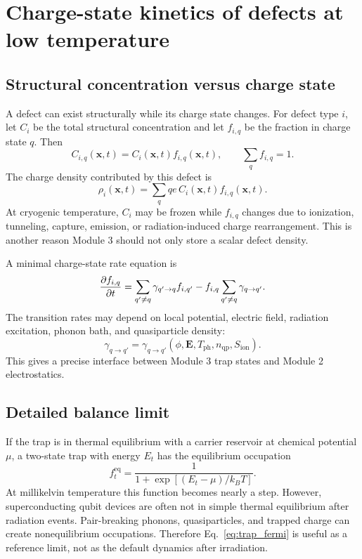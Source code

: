 \documentclass[11pt]{article}
\newcommand{\x}{\mathbf{x}}
\begin{document}
\section{Charge-state kinetics of defects at low temperature}

\subsection{Structural concentration versus charge state}

A defect can exist structurally while its charge state changes. For defect type $i$, let $C_i$ be the total structural concentration and let $f_{i,q}$ be the fraction in charge state $q$. Then
\begin{equation}
C_{i,q}(\x,t)=C_i(\x,t)f_{i,q}(\x,t),
\qquad
\sum_q f_{i,q}=1.
\label{eq:charge_state_fraction}
\end{equation}
The charge density contributed by this defect is
\begin{equation}
\rho_i(\x,t)=\sum_q q e\,C_i(\x,t)f_{i,q}(\x,t).
\label{eq:defect_charge_states}
\end{equation}
At cryogenic temperature, $C_i$ may be frozen while $f_{i,q}$ changes due to ionization, tunneling, capture, emission, or radiation-induced charge rearrangement. This is another reason Module 3 should not only store a scalar defect density.

A minimal charge-state rate equation is
\begin{equation}
\pdv{f_{i,q}}{t}
=\sum_{q'\neq q}\gamma_{q'\rightarrow q}f_{i,q'}
-f_{i,q}\sum_{q'\neq q}\gamma_{q\rightarrow q'}.
\label{eq:charge_state_master}
\end{equation}
The transition rates may depend on local potential, electric field, radiation excitation, phonon bath, and quasiparticle density:
\begin{equation}
\gamma_{q\rightarrow q'}=
\gamma_{q\rightarrow q'}(\phi,\mathbf{E},T_{\mathrm{ph}},n_{\mathrm{qp}},S_{\mathrm{ion}}).
\end{equation}
This gives a precise interface between Module 3 trap states and Module 2 electrostatics.

\subsection{Detailed balance limit}

If the trap is in thermal equilibrium with a carrier reservoir at chemical potential $\mu$, a two-state trap with energy $E_t$ has the equilibrium occupation
\begin{equation}
f_t^{\mathrm{eq}}=\frac{1}{1+\exp[(E_t-\mu)/k_BT]}.
\label{eq:trap_fermi}
\end{equation}
At millikelvin temperature this function becomes nearly a step. However, superconducting qubit devices are often not in simple thermal equilibrium after radiation events. Pair-breaking phonons, quasiparticles, and trapped charge can create nonequilibrium occupations. Therefore Eq.~\eqref{eq:trap_fermi} is useful as a reference limit, not as the default dynamics after irradiation.
\end{document}
